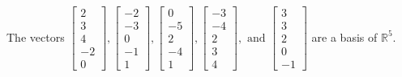 \begin{exercise}
\begin{exerciseStatement}
  \end{exerciseStatement}
  \begin{exerciseAnswer}
   The vectors \(\left[\begin{array}{r}
2 \\
3 \\
4 \\
-2 \\
0
\end{array}\right] , \left[\begin{array}{r}
-2 \\
-3 \\
0 \\
-1 \\
1
\end{array}\right] , \left[\begin{array}{r}
0 \\
-5 \\
2 \\
-4 \\
1
\end{array}\right] , \left[\begin{array}{r}
-3 \\
-4 \\
2 \\
3 \\
4
\end{array}\right] , \text{ and } \left[\begin{array}{r}
3 \\
3 \\
2 \\
0 \\
-1
\end{array}\right]\) 
  	 are  a basis of \(\mathbb{R}^5\).
  


  \end{exerciseAnswer}
\end{exercise}